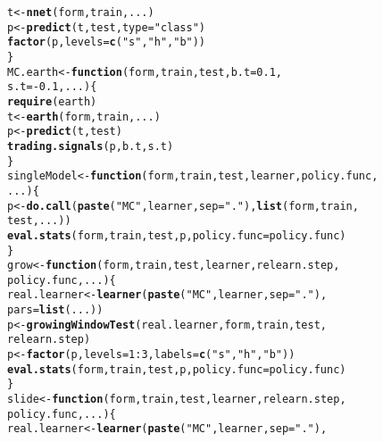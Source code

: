 \documentclass{article}\usepackage[]{graphicx}\usepackage[]{color}
\makeatletter
\newcommand{\hlnum}[1]{\textcolor[rgb]{0.686,0.059,0.569}{#1}}%
\newcommand{\hlstr}[1]{\textcolor[rgb]{0.192,0.494,0.8}{#1}}%
\newcommand{\hlopt}[1]{\textcolor[rgb]{0,0,0}{#1}}%
\newcommand{\hlstd}[1]{\textcolor[rgb]{0.345,0.345,0.345}{#1}}%
\newcommand{\hlkwa}[1]{\textcolor[rgb]{0.161,0.373,0.58}{\textbf{#1}}}%
\newcommand{\hlkwb}[1]{\textcolor[rgb]{0.69,0.353,0.396}{#1}}%
\newcommand{\hlkwc}[1]{\textcolor[rgb]{0.333,0.667,0.333}{#1}}%
\newcommand{\hlkwd}[1]{\textcolor[rgb]{0.737,0.353,0.396}{\textbf{#1}}}%
\newenvironment{kframe}{%
 \def\at@end@of@kframe{}%
 \ifinner\ifhmode%
  \def\at@end@of@kframe{\end{minipage}}%
  \begin{minipage}{\columnwidth}%
 \fi\fi%
 \def\FrameCommand##1{\hskip\@totalleftmargin \hskip-\fboxsep
 \colorbox{shadecolor}{##1}\hskip-\fboxsep
     \hskip-\linewidth \hskip-\@totalleftmargin \hskip\columnwidth}%
 \MakeFramed {\advance\hsize-\width
   \@totalleftmargin\z@ \linewidth\hsize
   \@setminipage}}%
 {\par\unskip\endMakeFramed%
 \at@end@of@kframe}
\newenvironment{knitrout}{}{} %
\makeatother
\begin{document}
\begin{knitrout}
\begin{kframe}
\begin{alltt}
  \hlstd{t} \hlkwb{<-} \hlkwd{nnet}\hlstd{(form, train, ...)}
  \hlstd{p} \hlkwb{<-} \hlkwd{predict}\hlstd{(t, test,} \hlkwc{type} \hlstd{=} \hlstr{"class"}\hlstd{)}
  \hlkwd{factor}\hlstd{(p,} \hlkwc{levels} \hlstd{=} \hlkwd{c}\hlstd{(}\hlstr{"s"}\hlstd{,} \hlstr{"h"}\hlstd{,} \hlstr{"b"}\hlstd{))}
\hlstd{\}}
\hlstd{MC.earth} \hlkwb{<-} \hlkwa{function}\hlstd{(}\hlkwc{form}\hlstd{,} \hlkwc{train}\hlstd{,} \hlkwc{test}\hlstd{,} \hlkwc{b.t} \hlstd{=} \hlnum{0.1}\hlstd{,}
                     \hlkwc{s.t} \hlstd{=} \hlopt{-}\hlnum{0.1}\hlstd{,} \hlkwc{...}\hlstd{) \{}
  \hlkwd{require}\hlstd{(earth)}
  \hlstd{t} \hlkwb{<-} \hlkwd{earth}\hlstd{(form, train,...)}
  \hlstd{p} \hlkwb{<-} \hlkwd{predict}\hlstd{(t, test)}
  \hlkwd{trading.signals}\hlstd{(p, b.t, s.t)}
\hlstd{\}}
\hlstd{singleModel} \hlkwb{<-} \hlkwa{function}\hlstd{(}\hlkwc{form}\hlstd{,} \hlkwc{train}\hlstd{,} \hlkwc{test}\hlstd{,} \hlkwc{learner}\hlstd{,} \hlkwc{policy.func}\hlstd{,}
                        \hlkwc{...}\hlstd{)\{}
  \hlstd{p} \hlkwb{<-} \hlkwd{do.call}\hlstd{(}\hlkwd{paste}\hlstd{(}\hlstr{"MC"}\hlstd{, learner,} \hlkwc{sep} \hlstd{=} \hlstr{"."}\hlstd{),} \hlkwd{list}\hlstd{(form, train,}
                                                     \hlstd{test, ...))}
  \hlkwd{eval.stats}\hlstd{(form, train, test, p,} \hlkwc{policy.func} \hlstd{= policy.func)}
  \hlstd{\}}
\hlstd{grow} \hlkwb{<-} \hlkwa{function}\hlstd{(}\hlkwc{form}\hlstd{,} \hlkwc{train}\hlstd{,} \hlkwc{test}\hlstd{,} \hlkwc{learner}\hlstd{,} \hlkwc{relearn.step}\hlstd{,}
                 \hlkwc{policy.func}\hlstd{,} \hlkwc{...}\hlstd{) \{}
  \hlstd{real.learner} \hlkwb{<-} \hlkwd{learner}\hlstd{(}\hlkwd{paste}\hlstd{(}\hlstr{"MC"}\hlstd{, learner,} \hlkwc{sep} \hlstd{=} \hlstr{"."}\hlstd{),}
                           \hlkwc{pars} \hlstd{=}\hlkwd{list}\hlstd{(...))}
  \hlstd{p} \hlkwb{<-} \hlkwd{growingWindowTest}\hlstd{(real.learner, form, train, test,}
                         \hlstd{relearn.step)}
  \hlstd{p} \hlkwb{<-} \hlkwd{factor}\hlstd{(p,} \hlkwc{levels} \hlstd{=} \hlnum{1}\hlopt{:}\hlnum{3}\hlstd{,} \hlkwc{labels} \hlstd{=} \hlkwd{c}\hlstd{(}\hlstr{"s"}\hlstd{,} \hlstr{"h"}\hlstd{,} \hlstr{"b"}\hlstd{))}
  \hlkwd{eval.stats}\hlstd{(form, train, test, p,} \hlkwc{policy.func} \hlstd{= policy.func)}
  \hlstd{\}}
\hlstd{slide} \hlkwb{<-} \hlkwa{function}\hlstd{(}\hlkwc{form}\hlstd{,} \hlkwc{train}\hlstd{,} \hlkwc{test}\hlstd{,} \hlkwc{learner}\hlstd{,} \hlkwc{relearn.step}\hlstd{,}
                  \hlkwc{policy.func}\hlstd{,} \hlkwc{...}\hlstd{) \{}
  \hlstd{real.learner} \hlkwb{<-} \hlkwd{learner}\hlstd{(}\hlkwd{paste}\hlstd{(}\hlstr{"MC"}\hlstd{, learner,} \hlkwc{sep} \hlstd{=} \hlstr{"."}\hlstd{),}

\end{alltt}
\end{kframe}
\end{knitrout}
\end{document}
